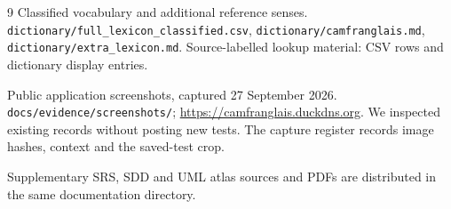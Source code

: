 \documentclass[11pt]{article}
\begin{document}
\begin{thebibliography}{9}
Classified vocabulary and additional reference senses.
\nolinkurl{dictionary/full_lexicon_classified.csv},
\nolinkurl{dictionary/camfranglais.md},
\nolinkurl{dictionary/extra_lexicon.md}.
Source-labelled lookup material: \ReferenceRows{} CSV rows and
\DictionaryCount{} dictionary display entries.

Public application screenshots, captured 27 September 2026.
\nolinkurl{docs/evidence/screenshots/};
\url{https://camfranglais.duckdns.org}.
We inspected existing records without posting new tests. The capture
register records image hashes, context and the saved-test crop.
\end{thebibliography}

Supplementary SRS, SDD and UML atlas sources and PDFs are distributed in the
same documentation directory.
\end{document}
